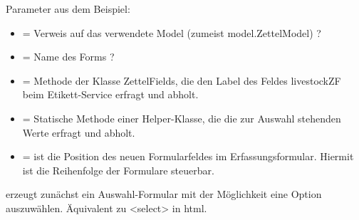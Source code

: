 \documentclass[letterpaper,10pt,ngerman]{sphinxmanual}
\begin{document}
Parameter aus dem Beispiel:
\begin{itemize}
\item {} 
 =  Verweis auf das verwendete Model (zumeist model.ZettelModel) ?

\item {} 
 =  Name des Forms ?

\item {} 
 = Methode der Klasse ZettelFields, die den Label des Feldes livestockZF beim Etikett-Service erfragt und abholt.

\item {} 
 = Statische Methode einer Helper-Klasse, die die zur Auswahl stehenden Werte erfragt und abholt.

\item {} 
 = ist die Position des neuen Formularfeldes im Erfassungsformular. Hiermit ist die Reihenfolge der Formulare steuerbar.

\end{itemize}

%
\begin{sphinxVerbatim}[commandchars=\\\{\}]
   
\end{sphinxVerbatim}

 erzeugt zunächst ein Auswahl-Formular mit der Möglichkeit eine Option auszuwählen. Äquivalent zu \textless{}select\textgreater{} in html.
\end{document}

